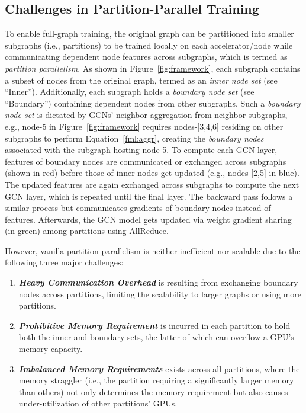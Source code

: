 \documentclass{article}
\begin{document}
\subsection{Challenges in Partition-Parallel Training}
\label{sec:BNS-cha}
\label{sec:vanilla}
To enable full-graph training, the original graph can be partitioned into smaller subgraphs (i.e., partitions) to be trained locally on each accelerator/node while communicating dependent node features across subgraphs, which is termed as \textit{partition parallelism}. 
As shown in Figure~\ref{fig:framework}, each subgraph contains a subset of nodes from the original graph, termed as an \textit{inner node set} (see ``Inner'').
Additionally, each subgraph holds a \textit{boundary node set} (see ``Boundary'') containing dependent nodes from other subgraphs. 
Such a \textit{boundary node set} is dictated by GCNs' neighbor aggregation from neighbor subgraphs, e.g., node-5 in Figure~\ref{fig:framework} requires nodes-[3,4,6] residing on other subgraphs to perform Equation~\ref{fml:aggr}, creating the \textit{boundary nodes} associated with the subgraph hosting node-5. 
To compute each GCN layer, features of boundary nodes are communicated or exchanged across subgraphs (shown in red) before those of inner nodes get updated (e.g., nodes-[2,5] in blue). 
The updated features are again exchanged across subgraphs to compute the next GCN layer, which is repeated until the final layer. 
The backward pass follows a similar process but communicates gradients of boundary nodes instead of features. 
Afterwards, the GCN model gets updated via weight gradient sharing (in green) among partitions using AllReduce.
   
    
However, vanilla partition parallelism is neither inefficient nor scalable due to the following three major challenges:
\begin{enumerate}[label=\roman*]
    \item \textit{\textbf{Heavy Communication Overhead}} is resulting from exchanging boundary nodes across partitions, limiting the scalability to larger graphs or using more partitions.
   
    \item \textit{\textbf{Prohibitive Memory Requirement}} is incurred in each partition to hold both the inner and boundary sets, the latter of which can overflow a GPU's memory capacity.
    
    \item \textit{\textbf{Imbalanced Memory Requirements}} exists across all partitions, where the memory straggler (i.e., the partition requiring a significantly larger memory than others) not only determines the memory requirement but also causes under-utilization of other partitions' GPUs.
  
\end{enumerate}
\end{document}

